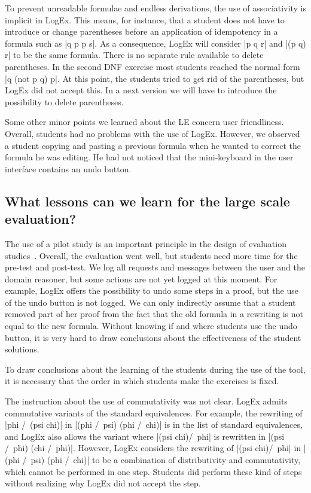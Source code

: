 \documentclass[a4paper,UKenglish]{lipics}
\begin{document}
 To prevent unreadable
formulae and endless derivations, the use of associativity is implicit in LogEx. 
This means, for instance,  that a student does not have to introduce or change parentheses 
before an application of idempotency in a formula such as |q \/ p \/ p \/ s|. 
As a consequence, LogEx will consider |p \/ q \/ r| and |(p \/ q) \/
r| to be the same formula. There is no separate rule available to delete parentheses.  In the second DNF exercise most students reached the
normal form |q \/ (not p \/ q) \/ p|. At this point, the students tried to get
rid of the parentheses, but LogEx did not accept this. In a next version we will
have to introduce the possibility to delete parentheses.

Some other minor points we learned about the LE concern user friendliness.
Overall, students had no problems with the use of LogEx. However, we observed a
student copying and pasting a previous formula when he wanted to correct the
formula he was editing. He had not noticed that the mini-keyboard in the user 
interface contains an undo button.

\subsection{What lessons can we learn for the large scale evaluation?}



The use of a pilot study is an important principle in the design of evaluation
studies~\cite{shute1993}. Overall, the evaluation went well, but students need
more time for the pre-test and post-test. We log all requests and messages
between the user and the domain reasoner, but some actions are not yet logged at
this moment. For example, LogEx offers the possibility to undo some steps in a
proof, but the use of the undo button is not logged. We can only indirectly
assume that a student removed part of her proof from the fact that the old
formula in a rewriting is not equal to the new formula. Without knowing if and
where students use the undo button, it is very hard to draw conclusions about
the effectiveness of the student solutions.

To draw conclusions about the learning of the students during the use of the tool, it is necessary that the order in which students make the exercises is fixed.


The instruction about the use of commutativity was not clear. LogEx admits
commutative variants of the standard equivalences. For example, the rewriting of
|phi /\ (psi \/ chi)| in |(phi /\ psi)\/ (phi /\ chi)| is in the
list of standard equivalences, and LogEx also allows the variant
where |(psi \/ chi)/\ phi| is rewritten in |(psi /\ phi)\/ (chi /\ phi)|.
However, LogEx considers the rewriting of |(psi \/ chi)/\ phi| in |(phi /\
psi)\/ (phi /\ chi)| to be a combination of distributivity and commutativity,
which cannot be performed in one step. Students did perform these kind of steps
without realizing why LogEx did not accept the step.
\end{document}
